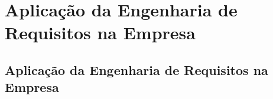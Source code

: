 \part{Aplicação da Engenharia de Requisitos na Empresa}
\chapter[Aplicação da Engenharia de Requisitos na Empresa]{Aplicação da Engenharia de Requisitos na Empresa}